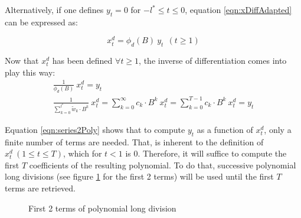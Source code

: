 \documentclass[a4paper]{report}
\begin{document}
Alternatively, if one defines $y_t = 0$ for $-l^* \leq t \leq 0$, equation 
\ref{eqn:xDiffAdapted} can be expressed as:

\begin{equation*}
	x_t^d = \phi_d (B) \ y_t \ \ (t \geq 1)
\end{equation*}

Now that $x_t^d$ has been defined $\forall t \geq 1$, the inverse of 
differentiation comes into play this way:
\begin{align}
	\frac{1}{\phi_d (B)} \ x_t^d = y_t \nonumber \\	
	\frac{1}{\sum_{k = 0}^{l^*} \widetilde{w}_k \cdot B^k} \ x_t^d = 
	\sum_{k = 0}^{\infty} c_k \cdot B^k \ x_t^d = \sum_{k = 0}^{T - 1} 
	c_k \cdot B^k \ x_t^d = y_t \label{eqn:series2Poly}
\end{align}

Equation \ref{eqn:series2Poly} shows that to compute $y_t$ as a function of 
$x_t^d$, only a finite number of terms are needed. That, is inherent to the 
definition of $x_t^d \ (1 \leq t \leq T)$, which for $t < 1$ is 0. 
Therefore, it will suffice to compute the first $T$ coefficients of the 
resulting polynomial. To do that, successive polynomial long divisions (see 
figure \ref{fig:polyLongDiv} for the first 2 terms) will be 
used until the first $T$ terms are retrieved.

\begin{figure}[htbp]
\centering
{}

\caption{First 2 terms of polynomial long division}
\label{fig:polyLongDiv}
\end{figure}
\end{document}
